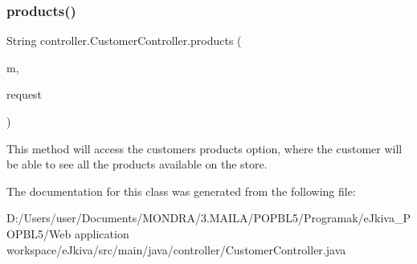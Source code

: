 \subsubsection{\texorpdfstring{products()}{products()}}
{\footnotesize\ttfamily String controller.\+Customer\+Controller.\+products (\begin{DoxyParamCaption}\item[{Model}]{m,  }\item[{Web\+Request}]{request }\end{DoxyParamCaption})\hspace{0.3cm}{\ttfamily [inline]}}

This method will access the customer\textquotesingle{}s \textquotesingle{}products\textquotesingle{} option, where the customer will be able to see all the products available on the store. 

The documentation for this class was generated from the following file\+:\begin{DoxyCompactItemize}
\item 
D\+:/\+Users/user/\+Documents/\+M\+O\+N\+D\+R\+A/3.\+M\+A\+I\+L\+A/\+P\+O\+P\+B\+L5/\+Programak/e\+Jkiva\+\_\+\+P\+O\+P\+B\+L5/\+Web application workspace/e\+Jkiva/src/main/java/controller/Customer\+Controller.\+java\end{DoxyCompactItemize}
